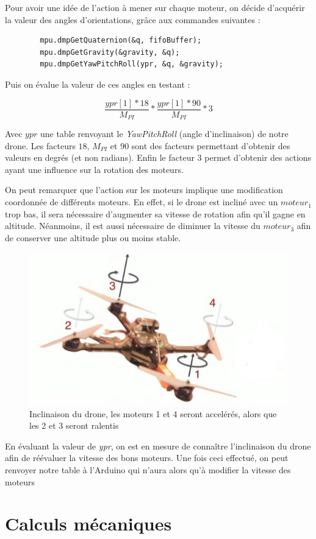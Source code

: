 \documentclass[a4paper,10pt]{report}
\begin{document}
	  Pour avoir une idée de l'action à mener sur chaque moteur, on décide 
d'acquérir la valeur des angles d'orientations, grâce aux commandes suivantes : 

	  \begin{verbatim}
	    mpu.dmpGetQuaternion(&q, fifoBuffer);
	    mpu.dmpGetGravity(&gravity, &q);
	    mpu.dmpGetYawPitchRoll(ypr, &q, &gravity);
	  \end{verbatim}

	  Puis on évalue la valeur de ces angles en testant :
	  
	  \begin{equation}
	    \frac{ypr[1] * 18}{M_{PI}} * \frac{ypr[1] * 90}{M_{PI}} * 3
	  \end{equation}

	  Avec $ypr$ une table renvoyant le \textit{YawPitchRoll} (angle 
d'inclinaison) de notre drone. Les facteurs $18$, $M_{PI}$ et $90$ sont des 
facteurs permettant d'obtenir des valeurs en degrés (et non radians). Enfin le 
facteur $3$ permet d'obtenir des actions ayant une influence sur la rotation 
des moteurs. 

	  On peut remarquer que l'action sur les moteurs implique une 
modification coordonnée de différents moteurs. En effet, si le drone est incliné 
avec un $moteur_1$ trop bas, il sera nécessaire d'augmenter sa vitesse de 
rotation afin qu'il gagne en altitude. Néanmoins, il est aussi nécessaire de 
diminuer la vitesse du $moteur_3$ afin de conserver une altitude plus ou moins 
stable. 

	  \begin{figure}[htbp]
	    \centering
	    \includegraphics[scale = 0.5]{img/quadcopter.jpg}
	    \caption{Inclinaison du drone, les moteurs 1 et 4 
seront accelérés, alors que les 2 et 3 seront ralentis}
	    \label{inclinaisondrone}
	  \end{figure}

	  En évaluant la valeur de \textit{ypr}, on est en mesure de connaître 
l'inclinaison du drone afin de réévaluer la vitesse des bons moteurs. Une fois 
ceci effectué, on peut renvoyer notre table à l'Arduino qui n'aura alors qu'à 
modifier la vitesse des moteurs
    
    \chapter{Calculs mécaniques}

  \listoffigures
  
  \raggedright
  
  
\end{document}
